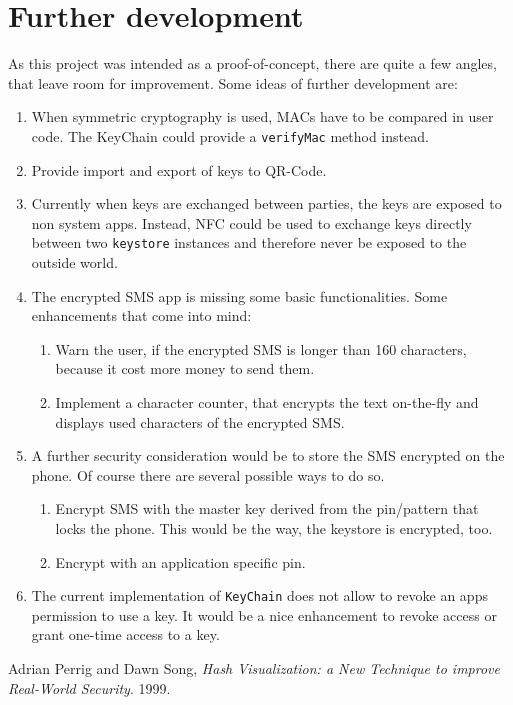 \documentclass[a4paper,bibtotoc,draft]{scrartcl}
\begin{document}
	
\section{Further development}
	As this project was intended as a proof-of-concept, there are quite a few angles, that leave room for improvement. Some ideas of further development are:
	\begin{enumerate}
		\item When symmetric cryptography is used, MACs have to be compared in user code. The KeyChain could provide a \texttt{verifyMac} method instead.
		\item Provide import and export of keys to QR-Code.
		\item Currently when keys are exchanged between parties, the keys are exposed to non system apps. Instead, NFC could be used to exchange keys directly between two \texttt{keystore} instances and therefore never be exposed to the outside world.
		\item The encrypted SMS app is missing some basic functionalities. Some enhancements that come into mind:
		\begin{enumerate}
			\item Warn the user, if the encrypted SMS is longer than 160 characters, because it cost more money to send them.
			\item Implement a character counter, that encrypts the text on-the-fly and displays used characters of the encrypted SMS.
		\end{enumerate}
		\item A further security consideration would be to store the SMS encrypted on the phone. Of course there are several possible ways to do so.
		\begin{enumerate}
			\item Encrypt SMS with the master key derived from the pin/pattern that locks the phone. This would be the way, the keystore is encrypted, too.
			\item Encrypt with an application specific pin.
		\end{enumerate}
		\item The current implementation of \texttt{KeyChain} does not allow to revoke an apps permission to use a key. It would be a nice enhancement to revoke access or grant one-time access to a key.
	\end{enumerate}

\begin{thebibliography}{9}
		Adrian Perrig and Dawn Song,
		{\em Hash Visualization: a New Technique to improve Real-World Security}.
		1999.
\end{thebibliography}
\end{document}
